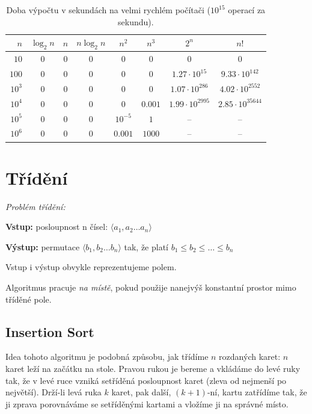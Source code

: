 \documentclass[openany,12pt,a4paper]{book}
\begin{document}
\vspace{1em}

\begin{table}[h!]
\centering
\begin{tabular}{rccccccc}
\toprule
$n$ & $\log_2 n$ & $n$ & $n \log_2 n$ & $n^2$ & $n^3$ & $2^n$ & $n!$ \\
\midrule
$10$   & $0$ & $0$ & $0$ & $0$ & $0$ & $0$ & $0$ \\
$100$  & $0$ & $0$ & $0$ & $0$ & $0$ & $1.27\cdot10^{15}$ & $9.33\cdot10^{142}$ \\
$10^3$ & $0$ & $0$ & $0$ & $0$ & $0$ & $1.07\cdot10^{286}$ & $4.02\cdot10^{2552}$ \\
$10^4$ & $0$ & $0$ & $0$ & $0$ & $0.001$ & $1.99\cdot10^{2995}$ & $2.85\cdot10^{35644}$ \\
$10^5$ & $0$ & $0$ & $0$ & $10^{-5}$ & $1$ & -- & -- \\
$10^6$ & $0$ & $0$ & $0$ & $0.001$ & $1000$ & -- & -- \\
\bottomrule
\end{tabular}
\caption{Doba výpočtu v sekundách na velmi rychlém počítači ($10^{15}$ operací za sekundu).}
\end{table}

\chapter{Třídění}

\begin{definition}
\emph{Problém třídění:}

\textbf{Vstup:} posloupnost n čísel: $\langle a_1, a_2 \dots a_n \rangle$

\textbf{Výstup:} permutace $\langle b_1, b_2 \dots b_n \rangle$ tak, že platí 
$b_1 \leq b_2 \leq \dots \leq b_n$

Vstup i výstup obvykle reprezentujeme polem.
\end{definition}

\begin{definition}

Algoritmus pracuje \emph{na místě}, pokud použije nanejvýš konstantní prostor mimo tříděné pole.

\end{definition}


\section{Insertion Sort}

Idea tohoto algoritmu je podobná způsobu, jak třídíme \( n \) rozdaných karet:  
\( n \) karet leží na začátku na stole. Pravou rukou je bereme a vkládáme do levé ruky tak, že v levé ruce vzniká setříděná posloupnost karet (zleva od nejmenší po největší). Drží-li levá ruka \( k \) karet, pak další, \((k + 1)\)-ní, kartu zatřídíme tak, že ji zprava porovnáváme se setříděnými kartami a vložíme ji na správné místo.
\end{document}
